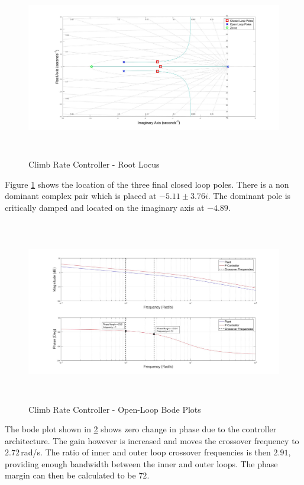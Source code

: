 	 \begin{figure}[H]
	 	\centering
	 	\includegraphics[height = 7.9cm]{../Design/Matlab/Controllers/climb_rate_root.jpg}
	 	\caption{Climb Rate Controller -  Root Locus}
	 	\label{IM_ClimbRateRoot}
	 \end{figure}
	 
	 Figure \ref{IM_ClimbRateRoot} shows the location of the three final closed loop poles. There is a non dominant complex pair which is placed at $-5.11 \pm 3.76i$. The dominant pole is critically damped and located on the imaginary axis at $-4.89$.
	 
	 \begin{figure}[H]
	 	\centering
	 	\includegraphics[height = 8cm]{../Design/Matlab/Controllers/climb_rate_bode.jpg}
	 	\caption{Climb Rate Controller - Open-Loop Bode Plots}
	 	\label{IM_ClimbRateBode}
	 \end{figure}
	 
	 The bode plot shown in \ref{IM_ClimbRateBode} shows zero change in phase due to the controller architecture. The gain however is increased and moves the crossover frequency to $2.72$\,rad/s. The ratio of inner and outer loop crossover frequencies is then $2.91$, providing enough bandwidth between the inner and outer loops. The phase margin can then be calculated to be $72$\textdegree. 
	 
